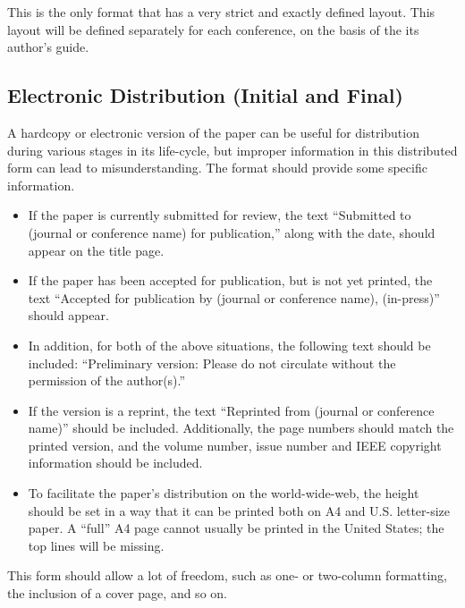 \documentclass[%
	final,
	reprint,
	notitlepage,
	narroweqnarray,
	inline,
	twoside,
        invited,
	]{ieee}
\begin{document}
This is the only format that has a very strict and exactly defined
layout.  This layout will be defined separately for each conference,
on the basis of the its author's guide.

\subsection{Electronic Distribution (Initial and Final)}

A hardcopy or electronic version of the paper can be useful for
distribution during various stages in its life-cycle, but improper
information in this distributed form can lead to misunderstanding.
The format should provide some specific information.
\begin{itemize}
\item If the paper is currently submitted for review, the
      text ``Submitted to (journal or conference name) for
      publication,'' along with the date, should appear on the title
      page.  
\item If the paper has been accepted for publication, but is not
      yet printed, the text ``Accepted for publication by (journal or
      conference name), (in-press)'' should appear. 
\item In addition, for both of the above situations, the following text 
      should be included: ``Preliminary version: Please do not circulate 
      without the permission of the author(s).''
\item If the version is a reprint, the 
      text ``Reprinted from (journal or conference name)'' should be 
      included. Additionally, the page numbers should match the printed
      version, and the volume number, issue number and IEEE copyright 
      information should be included. 
\item To facilitate the paper's distribution on the world-wide-web,
      the height should be set 
      in a way that it can be printed both on A4 and U.S. letter-size paper. 
      A ``full'' A4 page cannot usually be printed in the United 
      States; the top lines will be missing. 
\end{itemize}
This form should allow a lot of freedom, such as one- or two-column
formatting, the inclusion of a cover page, and so on.

\end{document}
